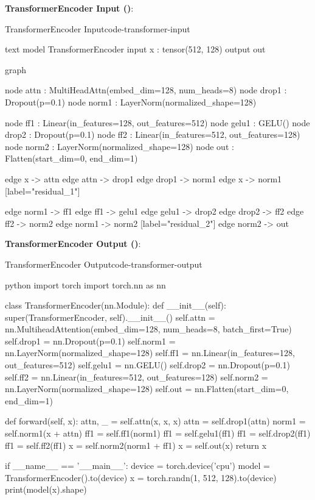 \documentclass{nngraph-en}
\begin{document}
\textbf{TransformerEncoder Input ()}:
\begin{codebox}{TransformerEncoder Input}{code-transformer-input}
\begin{amzcode}[fontsize=\scriptsize]{text}
model TransformerEncoder {
    input x : tensor(512, 128)
    output out
}

graph {
    node attn  : MultiHeadAttn(embed_dim=128, num_heads=8)
    node drop1 : Dropout(p=0.1)
    node norm1 : LayerNorm(normalized_shape=128)

    node ff1   : Linear(in_features=128, out_features=512)
    node gelu1 : GELU()
    node drop2 : Dropout(p=0.1)
    node ff2   : Linear(in_features=512, out_features=128)
    node norm2 : LayerNorm(normalized_shape=128)
    node out   : Flatten(start_dim=0, end_dim=1)

    edge x -> attn
    edge attn -> drop1
    edge drop1 -> norm1
    edge x -> norm1 [label="residual_1"]

    edge norm1 -> ff1
    edge ff1 -> gelu1
    edge gelu1 -> drop2
    edge drop2 -> ff2
    edge ff2 -> norm2
    edge norm1 -> norm2 [label="residual_2"]
    edge norm2 -> out
}
\end{amzcode}
\end{codebox}

\textbf{TransformerEncoder Output ()}:
\begin{codebox}{TransformerEncoder Output}{code-transformer-output}
\begin{amzcode}[fontsize=\scriptsize]{python}
import torch
import torch.nn as nn

class TransformerEncoder(nn.Module):
    def __init__(self):
        super(TransformerEncoder, self).__init__()
        self.attn = nn.MultiheadAttention(embed_dim=128, num_heads=8, batch_first=True)
        self.drop1 = nn.Dropout(p=0.1)
        self.norm1 = nn.LayerNorm(normalized_shape=128)
        self.ff1 = nn.Linear(in_features=128, out_features=512)
        self.gelu1 = nn.GELU()
        self.drop2 = nn.Dropout(p=0.1)
        self.ff2 = nn.Linear(in_features=512, out_features=128)
        self.norm2 = nn.LayerNorm(normalized_shape=128)
        self.out = nn.Flatten(start_dim=0, end_dim=1)

    def forward(self, x):
        attn, _ = self.attn(x, x, x)
        attn = self.drop1(attn)
        norm1 = self.norm1(x + attn)
        ff1 = self.ff1(norm1)
        ff1 = self.gelu1(ff1)
        ff1 = self.drop2(ff1)
        ff1 = self.ff2(ff1)
        x = self.norm2(norm1 + ff1)
        x = self.out(x)
        return x

if __name__ == '__main__':
    device = torch.device('cpu')
    model = TransformerEncoder().to(device)
    x = torch.randn(1, 512, 128).to(device)
    print(model(x).shape)
\end{amzcode}
\end{codebox}
\end{document}
